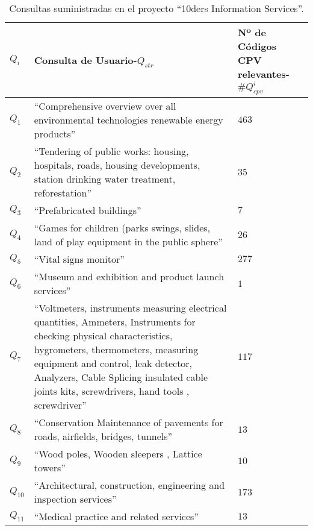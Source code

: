 \documentclass[a4paper,final,11pt,fleqn,twoside]{book}  %
\begin{document}
\begin{table}[!t]
  \centering
  \caption{Consultas suministradas en el proyecto ``10ders Information Services''.}\label{table:queries-ir}    
\begin{tabular}[c]{|l|p{5.5cm}|p{1.5cm}|} 
\hline
\textbf{$Q_{i}$} &  \textbf{Consulta de Usuario-$Q_{str}$} &  \textbf{Nº de Códigos CPV relevantes-$\#Q^{i}_{cpv}$} \\\hline
$Q_1$ & ``Comprehensive overview over all environmental technologies renewable energy products'' & $463$ \\ \hline
$Q_2$ & ``Tendering of public works: housing, hospitals, roads, housing developments, station drinking water treatment, reforestation'' & $35$ \\ \hline
$Q_3$ & ``Prefabricated buildings'' & $7$ \\ \hline
$Q_4$ & ``Games for children (parks swings, slides, land of play equipment in the public sphere'' & $26$ \\ \hline
$Q_5$ & ``Vital signs monitor'' &  $277$\\ \hline
$Q_6$ & ``Museum and exhibition and product launch services'' & $1$ \\ \hline
$Q_7$ & ``Voltmeters, instruments measuring electrical quantities, Ammeters, Instruments for checking physical characteristics, hygrometers, thermometers, measuring equipment and control, leak detector, Analyzers, 
Cable Splicing insulated cable joints kits, screwdrivers, hand tools , screwdriver'' & $117$ \\ \hline
$Q_8$ & ``Conservation Maintenance of pavements for roads, airfields, bridges, tunnels'' & $13$ \\ \hline
$Q_9$ & ``Wood poles, Wooden sleepers , Lattice towers'' & $10$ \\ \hline
$Q_{10}$ & ``Architectural, construction, engineering and inspection services'' &  $173$\\ \hline
$Q_{11}$ & ``Medical practice and related services'' &  $13$\\ \hline
\hline
 \end{tabular}

 \end{table} 
\end{document}
